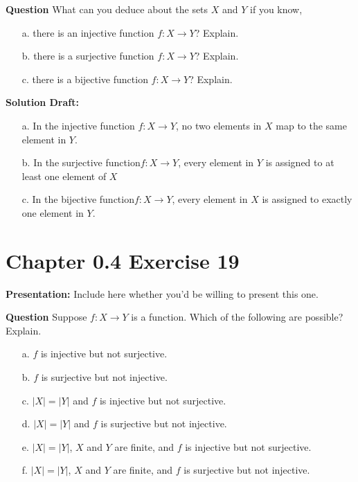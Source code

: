 \documentclass{article}
\begin{document}
\vspace{0.5cm} %

\noindent\textbf{Question}
What can you deduce about the sets \(X\) and \(Y\) if you know,

\begin{enumerate}
    \item[a.] there is an injective function \(f : X \rightarrow Y\)? Explain.
    \item[b.] there is a surjective function \(f : X \rightarrow Y\)? Explain.
    \item[c.] there is a bijective function \(f : X \rightarrow Y\)? Explain.
\end{enumerate} 

\noindent\textbf{Solution Draft:} 

\begin{enumerate}
    \item[a.] In the injective function \(f : X \rightarrow Y\), no two elements in $X$ map to the same element in $Y$.
    \item[b.] In the surjective function\(f : X \rightarrow Y\), every element in $Y$ is assigned to at least one element of $X$
    \item[c.] In the bijective function\(f : X \rightarrow Y\), every element in $X$ is assigned to exactly one element in $Y$.
\end{enumerate} 

\section*{Chapter 0.4 Exercise 19}  

\noindent\textbf{Presentation:} Include here whether you'd be willing to present this one. 

\vspace{0.5cm} %

\noindent\textbf{Question}
Suppose \(f : X \rightarrow Y\) is a function. Which of the following are possible? Explain.

\begin{itemize}
    \item[a.] \(f\) is injective but not surjective.
    \item[b.] \(f\) is surjective but not injective.
    \item[c.] \(|X| = |Y|\) and \(f\) is injective but not surjective.
    \item[d.] \(|X| = |Y|\) and \(f\) is surjective but not injective.
    \item[e.] \(|X| = |Y|\), \(X\) and \(Y\) are finite, and \(f\) is injective but not surjective.
    \item[f.] \(|X| = |Y|\), \(X\) and \(Y\) are finite, and \(f\) is surjective but not injective.
\end{itemize}
\end{document}
